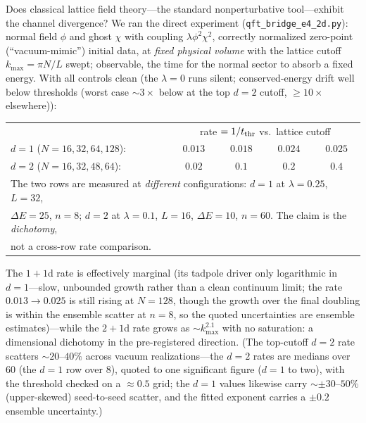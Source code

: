 \documentclass[11pt]{article}
\theoremstyle{definition}
\theoremstyle{remark}
\begin{document}
Does classical lattice field theory---the standard nonperturbative
tool---exhibit the channel divergence? We ran the direct experiment
(\texttt{qft\_bridge\_e4\_2d.py}): normal field $\phi$ and ghost
$\chi$ with coupling $\lambda\phi^{2}\chi^{2}$, correctly normalized
zero-point (``vacuum-mimic'') initial data, at \emph{fixed physical
volume} with the lattice cutoff $k_{\max}=\pi N/L$ swept; observable,
the time for the normal sector to absorb a fixed energy. With all
controls clean (the $\lambda=0$ runs silent; conserved-energy drift
well below thresholds (worst case ${\sim}3\times$ below at the top $d{=}2$ cutoff, ${\ge}10\times$ elsewhere)):
\begin{center}
\begin{tabular}{lcccc}
\toprule
& \multicolumn{4}{c}{rate $=1/t_{\rm thr}$ vs.\ lattice cutoff}\\
$d=1$ ($N=16,32,64,128$): & $0.013$ & $0.018$ & $0.024$ & $0.025$\\
$d=2$ ($N=16,32,48,64$): & $0.02$ & $0.1$ & $0.2$ & $0.4$\\
\midrule
\multicolumn{5}{l}{\footnotesize The two rows are measured at
\emph{different} configurations: $d=1$ at
$\lambda=0.25$, $L=32$,}\\
\multicolumn{5}{l}{\footnotesize $\Delta E=25$, $n=8$;
$d=2$ at $\lambda=0.1$, $L=16$, $\Delta E=10$, $n=60$. The claim is the
\emph{dichotomy},}\\
\multicolumn{5}{l}{\footnotesize not a cross-row rate comparison.}\\
\bottomrule
\end{tabular}
\end{center}
The $1{+}1$d rate is effectively marginal (its tadpole driver only logarithmic in $d{=}1$---slow, unbounded growth rather than a clean continuum limit; the rate $0.013\to0.025$ is still rising at $N{=}128$, though the growth over the final doubling is within the ensemble scatter at $n=8$, so the quoted uncertainties are ensemble estimates)---while
the $2{+}1$d rate grows as $\sim k_{\max}^{2.1}$ with no
saturation: a dimensional dichotomy in the pre-registered direction. (The
top-cutoff $d{=}2$ rate scatters ${\sim}20$--$40\%$ across vacuum realizations---the
$d{=}2$ rates are medians over $60$ (the $d{=}1$ row over $8$), quoted to one
significant figure ($d{=}1$ to two), with the threshold checked on a ${\approx}0.5$ grid; the
$d{=}1$ values likewise carry ${\sim}{\pm}30$--$50\%$ (upper-skewed) seed-to-seed scatter, and the fitted
exponent carries a ${\pm}0.2$ ensemble uncertainty.)
\end{document}
